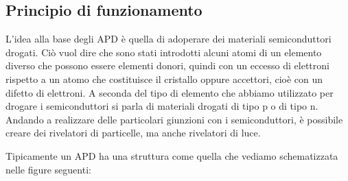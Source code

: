 \subsection{Principio di funzionamento}
L'idea alla base degli APD è quella di adoperare dei materiali semiconduttori drogati. Ciò vuol dire che sono stati introdotti alcuni atomi di un elemento diverso che possono essere elementi donori, quindi con un eccesso di elettroni rispetto a un atomo che costituisce il cristallo oppure accettori, cioè con un difetto di elettroni. A seconda del tipo di elemento che abbiamo utilizzato per drogare i semiconduttori si parla di materiali drogati di tipo p o di tipo n. Andando a realizzare delle particolari giunzioni con i semiconduttori, è possibile creare dei rivelatori di particelle, ma anche rivelatori di luce.

Tipicamente un APD ha una struttura come quella che vediamo schematizzata nelle figure seguenti:

